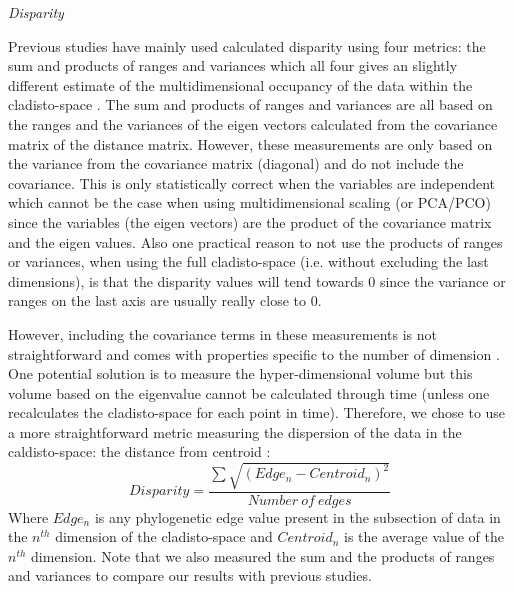 \documentclass[12pt,letterpaper]{article}
\renewcommand{\subsection}[1]{%
\bigskip
\begin{center}
\begin{large}
\normalfont\itshape #1
\end{large}
\end{center}}
\begin{document}
\subsection{Disparity}
Previous studies have mainly used calculated disparity using four metrics: the sum and products of ranges and variances which all four gives an slightly different estimate of the multidimensional occupancy of the data within the cladisto-space \citep{Foote01071994,Wills1994,brusatte50,Brusatte12092008,cisneros2010,thorneresetting2011,prentice2011,brusattedinosaur2012,toljagictriassic-jurassic2013,ruta2013,bentonmodels2014,bensonfaunal2014}.
The sum and products of ranges and variances are all based on the ranges and the variances of the eigen vectors calculated from the covariance matrix of the distance matrix.
However, these measurements are only based on the variance from the covariance matrix (diagonal) and do not include the covariance.
This is only statistically correct when the variables are independent which cannot be the case when using multidimensional scaling (or PCA/PCO) since the variables (the eigen vectors) are the product of the covariance matrix and the eigen values.
Also one practical reason to not use the products of ranges or variances, when using the full cladisto-space (i.e. without excluding the last dimensions), is that the disparity values will tend towards 0 since the variance or ranges on the last axis are usually really close to 0.

However, including the covariance terms in these measurements is not straightforward and comes with properties specific to the number of dimension \citep{Jackson,DonohueDim}.
One potential solution is to measure the hyper-dimensional volume \citep{Wills1994,DonohueDim} but this volume based on the eigenvalue cannot be calculated through time (unless one recalculates the cladisto-space for each point in time).
Therefore, we chose to use a more straightforward metric measuring the dispersion of the data in the caldisto-space: the distance from centroid \citep{finlay2015morphological}:
\begin{equation}
Disparity=\frac{\sum{\sqrt{(Edge_{n}-Centroid_{n})^2}}}{Number\ of\ edges}
\end{equation}
Where $Edge_{n}$ is any phylogenetic edge value present in the subsection of data in the $n^{th}$ dimension of the cladisto-space and $Centroid_{n}$ is the average value of the $n^{th}$ dimension.
Note that we also measured the sum and the products of ranges and variances to compare our results with previous studies. %
\end{document}
